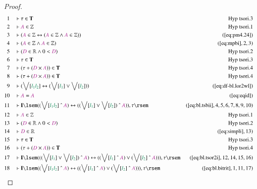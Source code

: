 \begin{proof}
\begin{align}
  1 &&  & \vdash \tau \in \mathbf{T}&\text{Hyp~tsori.3}\notag%
  \\ 2 &&  & \vdash \mc{A} \in \mathbb{Z}&\text{Hyp~tsori.1}\notag%
  \\ 3 &&  & \vdash ( \mc{A} \in \mathbb{Z} \leftrightarrow ( \mc{A} \in
      \mathbb{Z} \wedge \mc{A} \in \mathbb{Z} )
      )&(\mbox{\ref{eq:pm4.24}})\notag
  \\ 4 &&  & \vdash ( \mc{A} \in \mathbb{Z} \wedge \mc{A} \in \mathbb{Z}
      )&(\mbox{\ref{eq:mpbi}},2,3)\notag
  \\ 5 &&  & \vdash ( \mc{D} \in \mathbb{R} \wedge 0 < \mc{D}
      )&\text{Hyp~tsori.2}\notag%
  \\ 6 &&  & \vdash \tau \in \mathbf{T}&\text{Hyp~tsori.3}\notag%
  \\ 7 &&  & \vdash ( \tau + ( \mc{D} \times \mc{A} ) ) \in
      \mathbf{T}&\text{Hyp~tsori.4}\notag%
  \\ 8 &&  & \vdash ( \tau + ( \mc{D} \times \mc{A} ) ) \in
      \mathbf{T}&\text{Hyp~tsori.4}\notag%
  \\ 9 &&  & \vdash ( \bigvee[ \mwl{l_1} \mwl{l_2} ] \leftrightarrow ( \bigvee[
      \mwl{l_1} ] \vee \bigvee[ \mwl{l_2} ] )
      )&(\mbox{\ref{eq:df-bl.lor2wl}})\notag
  \\ 10 &&  & \vdash \mc{A} = \mc{A}&(\mbox{\ref{eq:eqid}})\notag
  \\ 11 &&  & \vdash \mathbf{I} \lsem ( ( \bigvee[ \mwl{l_1} \mwl{l_2} ]
      ~\string^~ \mc{A} ) \leftrightarrow ( ( \bigvee[
      \mwl{l_1} ] \vee \bigvee[ \mwl{l_2} ] ) ~\string^~
      \mc{A} ) ) , \tau
      \rsem&(\mbox{\ref{eq:bl.tsbii}},4,5,6,7,8,9,10)\notag
  \\ 12 &&  & \vdash \mc{A} \in \mathbb{Z}&\text{Hyp~tsori.1}\notag%
  \\ 13 &&  & \vdash ( \mc{D} \in \mathbb{R} \wedge 0 < \mc{D}
      )&\text{Hyp~tsori.2}\notag%
  \\ 14 &&  & \vdash \mc{D} \in \mathbb{R}&(\mbox{\ref{eq:simpli}},13)\notag
  \\ 15 &&  & \vdash \tau \in \mathbf{T}&\text{Hyp~tsori.3}\notag%
  \\ 16 &&  & \vdash ( \tau + ( \mc{D} \times \mc{A} ) ) \in
      \mathbf{T}&\text{Hyp~tsori.4}\notag%
  \\ 17 &&  & \vdash \mathbf{I} \lsem ( ( ( \bigvee[ \mwl{l_1} ] \vee \bigvee[
      \mwl{l_2} ] ) ~\string^~ \mc{A} ) \leftrightarrow ( (
      \bigvee[ \mwl{l_1} ] ~\string^~ \mc{A} ) \vee (
      \bigvee[ \mwl{l_2} ] ~\string^~ \mc{A} ) ) ) , \tau
      \rsem&(\mbox{\ref{eq:bl.tsor2i}},12,14,15,16)\notag
  \\ 18 &&  & \vdash \mathbf{I} \lsem ( ( \bigvee[ \mwl{l_1} \mwl{l_2} ]
      ~\string^~ \mc{A} ) \leftrightarrow ( ( \bigvee[
      \mwl{l_1} ] ~\string^~ \mc{A} ) \vee ( \bigvee[
      \mwl{l_2} ] ~\string^~ \mc{A} ) ) ) , \tau
      \rsem&(\mbox{\ref{eq:bl.bitrit}},1,11,17)\notag
\end{align}
\end{proof}

